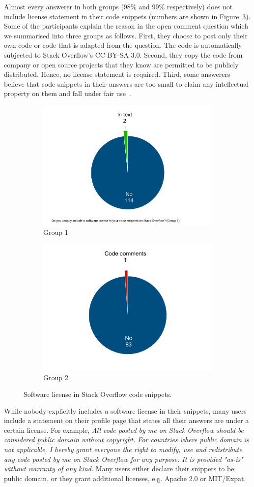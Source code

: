 \documentclass{svjour3}                     %
\begin{document}
Almost every answerer in both groups (98\% and 99\% respectively) does not
include license statement in their code snippets (numbers are shown in
Figure~\ref{fig:survey_license}). Some of the participants explain the reason in
the open comment question which we summarised into three groups as follows.
First, they choose to post only their own code or code that is adapted from the
question. The code is automatically subjected to Stack Overflow's CC BY-SA 3.0.
Second, they copy the code from company or open source projects that they know are
permitted to be publicly distributed. Hence, no license statement is required.
Third, some answerers believe that code snippets in their answers are too small
to claim any intellectual property on them and fall under fair
use~\citep{fairuse}.

\begin{figure}
	\begin{subfigure}{.5\textwidth}
		\centering
		\includegraphics[width=.4\linewidth]{survey_license_1}
		\caption{Group 1}
		\label{fig:survey_license_1}
	\end{subfigure}%
	\begin{subfigure}{.5\textwidth}
		\centering
		\includegraphics[width=.4\linewidth]{survey_license_2}
		\caption{Group 2}
		\label{fig:survey_license_2}
	\end{subfigure}
	\caption{Software license in Stack Overflow code snippets.}
	\label{fig:survey_license}
\end{figure}

While nobody explicitly includes a software license in their snippets,
many users include a statement on their profile page that states all their
answers are under a certain license. For example, \textit{All code posted by me on
	Stack Overflow should be considered public domain without copyright. For
	countries where public domain is not applicable, I hereby grant everyone the
	right to modify, use and redistribute any code posted by me on Stack Overflow
	for any purpose. It is provided "as-is" without warranty of any kind.}  Many
users either declare their snippets to be public domain, or they grant
additional licenses, e.g. Apache 2.0 or MIT/Expat.
\end{document}
